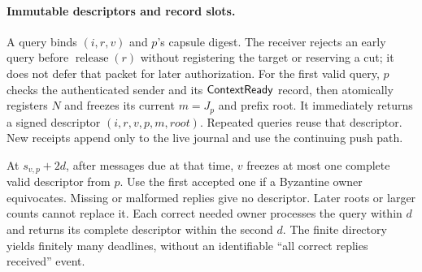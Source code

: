 \paragraph{Immutable descriptors and record slots.}
A query binds $(i,r,v)$ and $p$'s capsule digest. The receiver rejects
an early query before $\operatorname{release}(r)$ without registering
the target or reserving a cut; it does not defer that packet for later
authorization. For the first valid query, $p$ checks the authenticated
sender and its $\mathsf{ContextReady}$ record, then atomically registers
$N$ and freezes its current $m=J_p$ and prefix root. It immediately
returns a signed descriptor $(i,r,v,p,m,\mathit{root})$. Repeated
queries reuse that descriptor. New receipts append only to the live
journal and use the continuing push path.

At $s_{v,p}+2d$, after messages due at that time, $v$ freezes at most
one complete valid descriptor from $p$. Use the first accepted one if
a Byzantine owner equivocates. Missing or malformed replies give no
descriptor. Later roots or larger counts cannot replace it. Each
correct needed owner processes the query within $d$ and returns its
complete descriptor within the second $d$. The finite directory yields
finitely many deadlines, without an identifiable ``all correct replies
received'' event.

